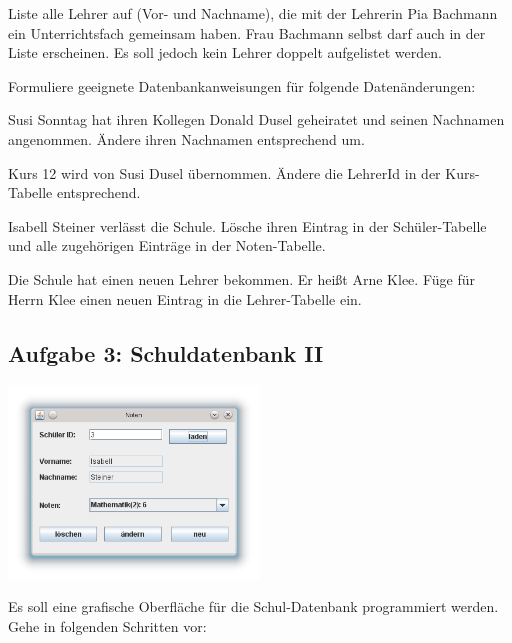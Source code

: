 \begin{compactenum}[a)]
\begin{compactenum}[1.]
\item Liste alle Lehrer auf (Vor- und Nachname), die mit der Lehrerin Pia
Bachmann ein Unterrichtsfach gemeinsam haben. Frau Bachmann selbst darf auch in
der Liste erscheinen. Es soll jedoch kein Lehrer doppelt aufgelistet werden.
\end{compactenum}

\item Formuliere geeignete Datenbankanweisungen für folgende Datenänderungen:

\begin{compactenum}[1.]
\item Susi Sonntag hat ihren Kollegen Donald Dusel geheiratet und seinen
Nachnamen angenommen. Ändere ihren Nachnamen entsprechend um.

\item Kurs 12 wird von Susi Dusel übernommen. Ändere die LehrerId in der
 Kurs-Tabelle entsprechend.

\item Isabell Steiner verlässt die Schule. Lösche ihren Eintrag in der
 Schüler-Tabelle und alle zugehörigen Einträge in der Noten-Tabelle.

\item Die Schule hat einen neuen Lehrer bekommen. Er heißt Arne Klee. Füge für
Herrn Klee einen neuen Eintrag in die Lehrer-Tabelle ein.
\end{compactenum}
\end{compactenum}


\subsection{Aufgabe 3: Schuldatenbank II}

\begin{center}
\includegraphics[width=0.5\textwidth]{./inf/SEKII/44_Abi-Training/Noten.png}
\end{center}

Es soll eine grafische Oberfläche für die Schul-Datenbank programmiert werden. Gehe in folgenden Schritten vor:

